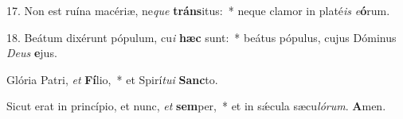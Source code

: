 \begin{latinenglishsection}
{	17. Non est ruína macériæ, ne\textit{que} \textbf{tráns}itus:~*
		neque clamor in platé\textit{is} \textit{e}\textbf{ó}rum.
	
	18. Beátum dixérunt pópulum, cu\textit{i} \textbf{hæc} sunt:~*
		beátus pópulus, cujus Dóminus \textit{De}\textit{us} \textbf{e}jus.
	
	Glória Patri, \textit{et} \textbf{Fí}lio,~*
		et Spirí\textit{tu}\textit{i} \textbf{Sanc}to.
	
	Sicut erat in princípio, et nunc, \textit{et} \textbf{sem}per,~*
		et in s\'{\ae}cula sæcu\textit{ló}\textit{rum}. \textbf{A}men.
}{
	
}

\end{latinenglishsection}